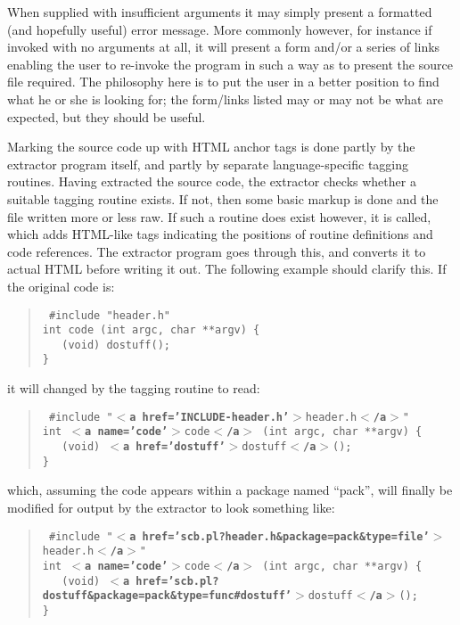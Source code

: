 \documentclass[twoside,11pt]{article}
\renewcommand{\_}{\texttt{\symbol{95}}}
\begin{document}
When supplied with insufficient arguments it may simply present
a formatted (and hopefully useful) error message. 
More commonly however, for instance if invoked with no arguments
at all, it will present a form and/or a series of links 
enabling the user to re-invoke the program 
in such a way as to present the source file required.
The philosophy here is to put the user in a better position 
to find what he or she is looking for; the form/links
listed may or may not be what are expected, but they should be useful.

Marking the source code up with HTML anchor tags 
is done partly by the extractor program itself, 
and partly by separate language-specific tagging routines.
Having extracted the source code, the extractor 
checks whether a suitable tagging routine exists. 
If not, then some basic markup is done and the file written 
more or less raw.
If such a routine does exist however, it is called, 
which adds
HTML-like tags indicating the positions of routine definitions 
and code references.
The extractor program goes through this, and converts it to 
actual HTML before writing it out.
The following example should clarify this.  
If the original code is:
%
%
\begin{quote}
\tt
\#include "header.h" \\
int code (int argc, char **argv) \{ \\
\mbox{}\ \ \ (void) do\_stuff(); \\
\} \\
\end{quote}
it will changed by the tagging routine to read:
\begin{quote}
\tt
\#include "{\bf $<$a href='INCLUDE-header.h'$>$}header.h{\bf $<$/a$>$}" \\
int {\bf $<$a name='code'$>$}code{\bf $<$/a$>$} (int argc, char **argv) \{ \\
\mbox{}\ \ \ (void) {\bf $<$a href='do\_stuff'$>$}do\_stuff{\bf $<$/a$>$}(); \\
\} \\
\end{quote}
which, assuming the code appears within a package named ``pack'', 
will finally be modified for output by the extractor to look something like:
\begin{quote}
\tt
\#include "{\bf $<$a href='scb.pl?header.h\&package=pack\&type=file'$>$}header.h{\bf $<$/a$>$}" \\
int {\bf $<$a name='code'$>$}code{\bf $<$/a$>$} (int argc, char **argv) \{ \\
\mbox{}\ \ \ (void) {\bf $<$a href='scb.pl?do\_stuff\&package=pack\&type=func\#do\_stuff'$>$}do\_stuff{\bf $<$/a$>$}(); \\
\} \\
\end{quote}
\end{document}
